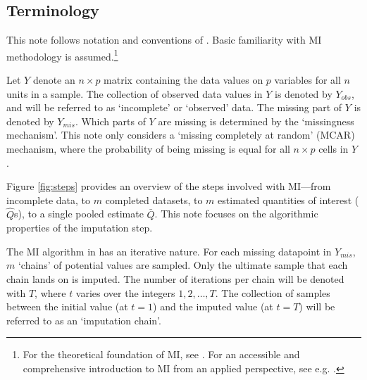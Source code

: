 \documentclass[article]{jss}
\begin{document}
\subsection{Terminology} \label{sec:terms}

This note follows notation and conventions of  \citep{mice}. %
Basic familiarity with MI methodology is assumed.\footnote{For the theoretical foundation of MI, see \cite{rubin87}. For an accessible and comprehensive introduction to MI from an applied perspective, see e.g. \cite{buur18}.} 

Let $Y$ denote an $n \times p$ matrix containing the data values on $p$ variables for all $n$ units in a sample. The collection of observed data values in $Y$ is denoted by $Y_{obs}$, and will be referred to as `incomplete' or `observed' data. The missing part of $Y$ is denoted by $Y_{mis}$. Which parts of $Y$ are missing is determined by the `missingness mechanism'.  
This note only considers a `missing completely at random' (MCAR) mechanism, where the probability of being missing is equal for all $n \times p$ cells in $Y$ \citep{rubin87}.

Figure \ref{fig:steps} provides an overview of the steps involved with MI---from incomplete data, to $m$ completed datasets, to $m$ estimated quantities of interest ($\hat{Q}$s), to a single pooled estimate $\bar{Q}$.
This note focuses on the algorithmic properties of the imputation step. 

The MI algorithm in  has an iterative nature. For each missing datapoint in $Y_{mis}$, $m$ `chains' of potential values are sampled. Only the ultimate sample that each chain lands on is imputed. The number of iterations per chain will be denoted with $T$, where $t$ varies over the integers $1, 2, \dots, T$.  %
The collection of samples between the initial value (at $t=1$) and the imputed value (at $t=T$) will be referred to as an `imputation chain'. 
\end{document}
